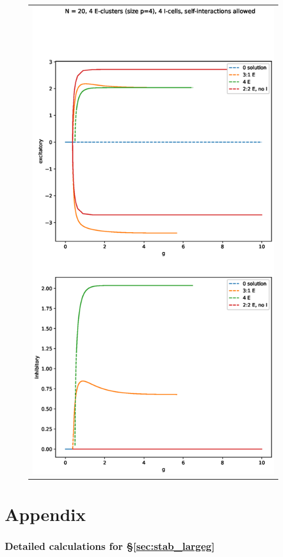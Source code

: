\documentclass[11pt,reqno]{amsart}
\begin{document}
\begin{figure}[H]
\centering
\begin{tabular}{c}
\includegraphics[width=12cm]{images/bifdiagc4p4i4selfint.eps}
\end{tabular}
\end{figure}

\section{Appendix}
\subsubsection{Detailed calculations for \S \ref{sec:stab_largeg}}
\end{document}
